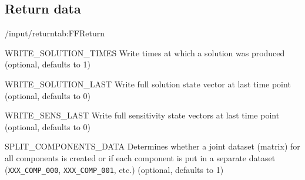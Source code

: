 \subsection{Return data}

\begin{groupscope}{/input/return}{tab:FFReturn}
  \begin{dataset}[type = int, range={$\{0,1\}$}]{WRITE\_SOLUTION\_TIMES}
    Write times at which a solution was produced (optional, defaults to 1)
  \end{dataset}
  \begin{dataset}[type = int, range={$\{0,1\}$}]{WRITE\_SOLUTION\_LAST}
    Write full solution state vector at last time point (optional, defaults to 0)
  \end{dataset}
  \begin{dataset}[type = int, range={$\{0,1\}$}]{WRITE\_SENS\_LAST}
    Write full sensitivity state vectors at last time point (optional, defaults to 0)
  \end{dataset}
  \begin{dataset}[type = int, range={$\{0,1\}$}]{SPLIT\_COMPONENTS\_DATA}
    Determines whether a joint dataset (matrix) for all components is created or if each component is put in a separate dataset (\texttt{XXX\_COMP\_000}, \texttt{XXX\_COMP\_001}, etc.) (optional, defaults to 1)
  \end{dataset}
\end{groupscope}

